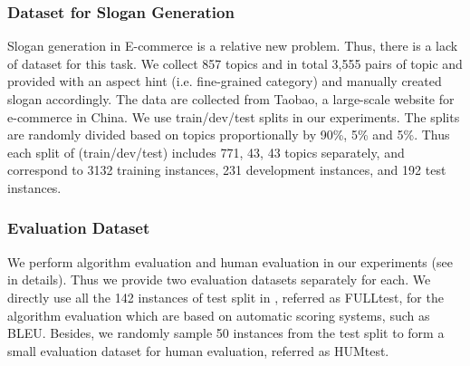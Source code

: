 \subsubsection{Dataset for Slogan Generation}
\label{sec:corpora}
Slogan generation in E-commerce is a relative new problem.
Thus, there is a lack of dataset for this task.
We collect 857 topics and in total 3,555 pairs of topic and provided with an aspect hint (i.e. fine-grained category)
and manually created slogan accordingly.
The data are collected from Taobao, a large-scale website for e-commerce in China.
We use train/dev/test splits in our experiments.
The splits are randomly divided based on topics 
proportionally by 90\%, 5\% and 5\%.
Thus each split of (train/dev/test) includes 771, 43, 43 topics separately,
and correspond to 3132 training instances, 231 development instances, 
and 192 test instances.

\subsubsection{Evaluation Dataset}
\label{sec:eval_dataset}
We perform algorithm evaluation and human evaluation
in our experiments (see  in details).
Thus we provide two evaluation datasets separately for each.
We directly use all the 142 instances of test split in ,
referred as FULLtest,
for the algorithm evaluation which are based on automatic scoring systems,
such as BLEU.
Besides, we randomly sample 50 instances from the test split
to form a small evaluation dataset for human evaluation,
referred as HUMtest.


